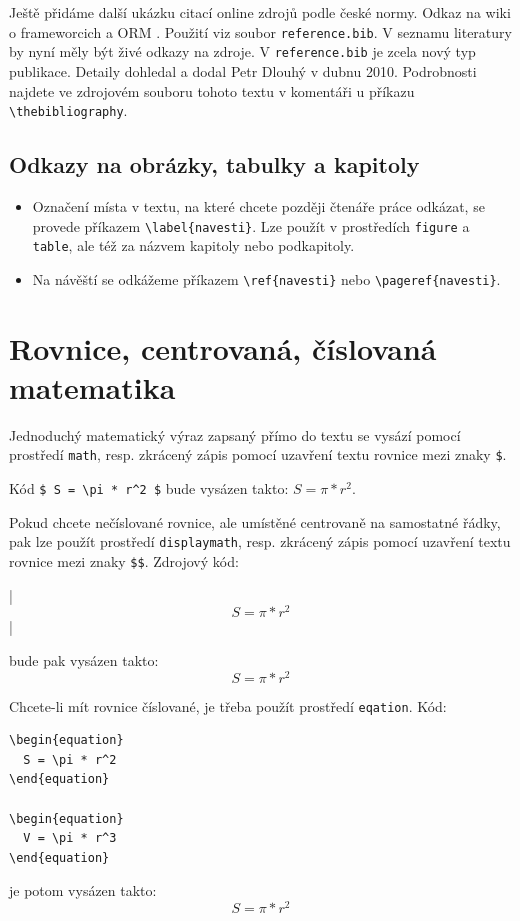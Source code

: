 \documentclass[11pt,twoside,a4paper]{book}
\begin{document}
Ještě přidáme další ukázku citací online zdrojů podle české normy. Odkaz na wiki o frameworcich \cite{wiki:framework} a ORM \cite{wiki:orm}. Použití viz soubor \verb|reference.bib|. V seznamu literatury by nyní měly být živé odkazy na zdroje. V \verb|reference.bib| je zcela nový typ publikace. Detaily dohledal a dodal Petr Dlouhý v dubnu 2010. Podrobnosti najdete ve zdrojovém souboru tohoto textu v komentáři u příkazu \verb|\thebibliography|.

\subsection{Odkazy na obrázky, tabulky a kapitoly}
\begin{itemize}
\item Označení místa v textu, na které chcete později čtenáře práce odkázat, se provede příkazem \verb|\label{navesti}|. Lze použít v prostředích \verb|figure| a  \verb|table|, ale též za názvem kapitoly nebo podkapitoly.
\item Na návěští se odkážeme příkazem \verb|\ref{navesti}| nebo \verb|\pageref{navesti}|.
\end{itemize}

\section{Rovnice, centrovaná, číslovaná matematika}
Jednoduchý matematický výraz zapsaný přímo do textu se vysází pomocí prostředí \verb|math|, resp. zkrácený zápis pomocí uzavření textu rovnice mezi znaky \verb|$|.

Kód \verb|$ S = \pi * r^2 $| bude vysázen takto: $ S = \pi * r^2 $.

Pokud chcete nečíslované rovnice, ale umístěné centrovaně na samostatné řádky, pak lze použít prostředí \verb|displaymath|, resp. zkrácený zápis pomocí uzavření textu rovnice mezi znaky \verb|$$|. Zdrojový kód: 
\begin{verb}
|$$ S = \pi * r^2 $$|
\end{verb}
bude pak vysázen takto:
$$ S = \pi * r^2 $$

Chcete-li mít rovnice číslované, je třeba použít prostředí \verb|eqation|. Kód:
\begin{verbatim}
\begin{equation}
  S = \pi * r^2
\end{equation}

\begin{equation}
  V = \pi * r^3
\end{equation}
\end{verbatim}
je potom vysázen takto:
\begin{equation}
  S = \pi * r^2
\end{equation}
\end{document}
